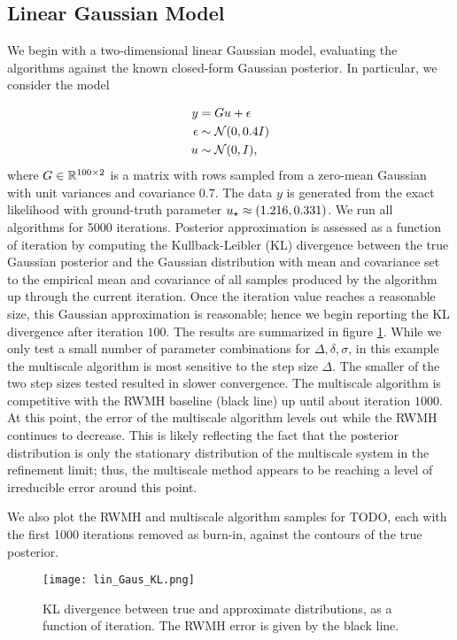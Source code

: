 \documentclass[12pt]{article}
\begin{document}
\subsection{Linear Gaussian Model}
We begin with a two-dimensional linear Gaussian model, evaluating the algorithms against the known closed-form Gaussian posterior. In particular, we consider the model 

\begin{align}
y &= G u + \epsilon \\
\epsilon &\sim \mathcal{N}(0, 0.4I) \nonumber \\
u &\sim \mathcal{N}(0, I), \nonumber
\end{align}
where $G \in \mathbb{R}^{100 \times 2}$ is a matrix with rows sampled from a zero-mean Gaussian with unit variances and covariance $0.7$. 
The data $y$ is generated from the exact likelihood with ground-truth parameter $u_\star \approx (1.216, 0.331)$. We run all 
algorithms for 5000 iterations. Posterior approximation is assessed as a function of iteration by computing the Kullback-Leibler (KL) divergence 
between the true Gaussian posterior and the Gaussian distribution with mean and covariance set to the empirical mean and covariance 
of all samples produced by the algorithm up through the current iteration. Once the iteration value reaches a reasonable size, this Gaussian 
approximation is reasonable; hence we begin reporting the KL divergence after iteration $100$. 
The results are summarized in figure \ref{fig:lin_Gaus_KL}. While we only test a small number of 
parameter combinations for $\Delta, \delta, \sigma$, in this example the multiscale algorithm is most sensitive to the step size $\Delta$. The smaller 
of the two step sizes tested resulted in slower convergence. The multiscale algorithm is competitive with the RWMH baseline (black line) up until 
about iteration $1000$. At this point, the error of the multiscale algorithm levels out while the RWMH continues to decrease. This is likely reflecting the 
fact that the posterior distribution is only the stationary distribution of the multiscale system in the refinement limit; thus, the multiscale method appears 
to be reaching a level of irreducible error around this point. 

We also plot the RWMH and multiscale algorithm samples for TODO, each with the first 1000 iterations 
removed as burn-in, against the contours of the true posterior.   

\begin{figure}[h] 
\centering
\texttt{[image: lin\_Gaus\_KL.png]}
\caption{KL divergence between true and approximate distributions, as a function of iteration. The RWMH error is given by the black line.}
\label{fig:lin_Gaus_KL}
\end{figure}
\end{document}
